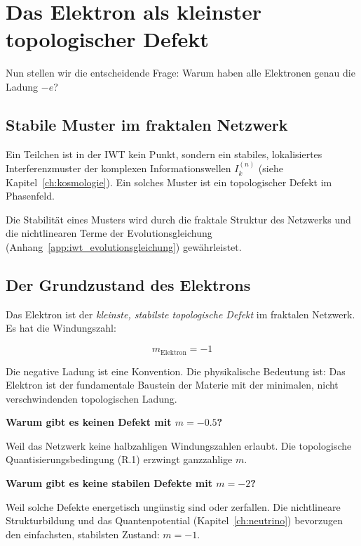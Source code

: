 \section{Das Elektron als kleinster topologischer Defekt}
\label{app:phasenquantisierung_elektron}

Nun stellen wir die entscheidende Frage: Warum haben alle Elektronen genau die Ladung \( -e \)?

\subsection{Stabile Muster im fraktalen Netzwerk}
\label{sub:phasenquantisierung_stabile_muster}

Ein Teilchen ist in der IWT kein Punkt, sondern ein stabiles, lokalisiertes Interferenzmuster der komplexen Informationswellen \( I_k^{(n)} \) (siehe Kapitel~\ref{ch:kosmologie}). Ein solches Muster ist ein topologischer Defekt im Phasenfeld.

Die Stabilität eines Musters wird durch die fraktale Struktur des Netzwerks und die nichtlinearen Terme der Evolutionsgleichung (Anhang~\ref{app:iwt_evolutionsgleichung}) gewährleistet.

\subsection{Der Grundzustand des Elektrons}
\label{sub:phasenquantisierung_grundzustand}

Das Elektron ist der \emph{kleinste, stabilste topologische Defekt} im fraktalen Netzwerk. Es hat die Windungszahl:

\[
m_{\text{Elektron}} = -1
\tag{R.11}
\]

Die negative Ladung ist eine Konvention. Die physikalische Bedeutung ist: Das Elektron ist der fundamentale Baustein der Materie mit der minimalen, nicht verschwindenden topologischen Ladung.

\textbf{Warum gibt es keinen Defekt mit \( m = -0.5 \)?}

Weil das Netzwerk keine halbzahligen Windungszahlen erlaubt. Die topologische Quantisierungsbedingung (R.1) erzwingt ganzzahlige \( m \).

\textbf{Warum gibt es keine stabilen Defekte mit \( m = -2 \)?}

Weil solche Defekte energetisch ungünstig sind oder zerfallen. Die nichtlineare Strukturbildung und das Quantenpotential (Kapitel~\ref{ch:neutrino}) bevorzugen den einfachsten, stabilsten Zustand: \( m = -1 \).


